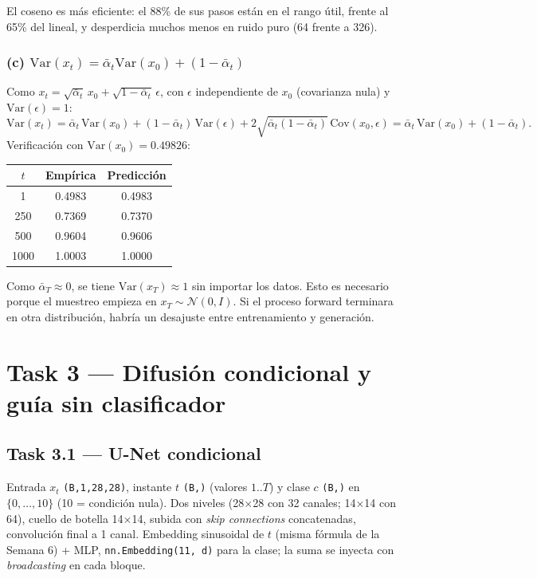 \documentclass[11pt]{article}
\begin{document}
El coseno es más eficiente: el 88\% de sus pasos están en el rango útil, frente al 65\% del lineal, y desperdicia muchos menos en ruido puro (64 frente a 326).

\subsubsection*{(c) $\mathrm{Var}(x_t)=\bar\alpha_t\mathrm{Var}(x_0)+(1-\bar\alpha_t)$}
Como $x_t=\sqrt{\bar\alpha_t}\,x_0+\sqrt{1-\bar\alpha_t}\,\epsilon$, con $\epsilon$ independiente de $x_0$ (covarianza nula) y $\mathrm{Var}(\epsilon)=1$:
\[\mathrm{Var}(x_t)=\bar\alpha_t\,\mathrm{Var}(x_0)+(1-\bar\alpha_t)\,\mathrm{Var}(\epsilon)+2\sqrt{\bar\alpha_t(1-\bar\alpha_t)}\,\mathrm{Cov}(x_0,\epsilon)=\bar\alpha_t\,\mathrm{Var}(x_0)+(1-\bar\alpha_t).\]
Verificación con $\mathrm{Var}(x_0)=0.49826$:
\begin{table}[H]
\centering
\begin{tabular}{ccc}
\toprule
$t$ & Empírica & Predicción \\
\midrule
1 & 0.4983 & 0.4983 \\
250 & 0.7369 & 0.7370 \\
500 & 0.9604 & 0.9606 \\
1000 & 1.0003 & 1.0000 \\
\bottomrule
\end{tabular}
\end{table}

Como $\bar\alpha_T\approx0$, se tiene $\mathrm{Var}(x_T)\approx1$ sin importar los datos. Esto es necesario porque el muestreo empieza en $x_T\sim\mathcal N(0,I)$. Si el proceso forward terminara en otra distribución, habría un desajuste entre entrenamiento y generación.

\section*{Task 3 --- Difusión condicional y guía sin clasificador}

\subsection*{Task 3.1 --- U-Net condicional}
Entrada $x_t$ \texttt{(B,1,28,28)}, instante $t$ \texttt{(B,)} (valores $1..T$) y clase $c$ \texttt{(B,)} en $\{0,\dots,10\}$ (10 = condición nula). Dos niveles (28$\times$28 con 32 canales; 14$\times$14 con 64), cuello de botella 14$\times$14, subida con \emph{skip connections} concatenadas, convolución final a 1 canal. Embedding sinusoidal de $t$ (misma fórmula de la Semana 6) + MLP, \texttt{nn.Embedding(11, d)} para la clase; la suma se inyecta con \emph{broadcasting} en cada bloque.
\end{document}
